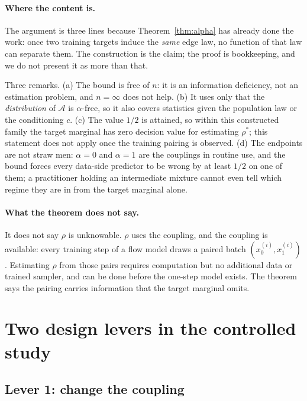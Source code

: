 \documentclass{article}
\theoremstyle{plain}
\begin{document}
\paragraph{Where the content is.} The argument is three lines because
Theorem~\ref{thm:alpha} has already done the work: once two training targets induce the
\emph{same} edge law, no function of that law can separate them. The construction is the
claim; the proof is bookkeeping, and we do not present it as more than that.

Three remarks. (a) The bound is free of $n$: it is an information deficiency, not an
estimation problem, and $n=\infty$ does not help. (b) It uses only that the
\emph{distribution} of $\mathcal A$ is $\alpha$-free, so it also covers statistics given the
population law or the conditioning $c$. (c) The value $1/2$ is attained, so within this
constructed family the target marginal has zero decision value for estimating
$\rho^\ast$; this statement does not apply once the training pairing is observed.
(d) The endpoints are not straw men: $\alpha=0$ and $\alpha=1$ are the couplings in
routine use, and the bound forces every data-side predictor to be wrong by at least
$1/2$ on one of them; a practitioner holding an intermediate mixture cannot even tell
which regime they are in from the target marginal alone.

\paragraph{What the theorem does not say.} It does not say $\rho$ is unknowable.
$\rho$ uses the coupling, and the coupling is available: every training step of a flow
model draws a paired batch $(x_0^{(i)},x_1^{(i)})$. Estimating $\rho$ from those pairs
requires computation but no additional data or trained sampler, and can be done before
the one-step model exists. The theorem says the pairing carries information that the
target marginal omits.

\section{Two design levers in the controlled study}
\label{sec:ladder}

\subsection{Lever 1: change the coupling}
\end{document}
